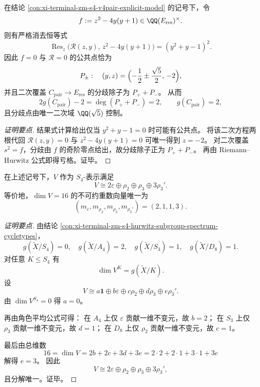 \begin{conclusion}\label{con:xi-terminal-zm-s4-v4pair-golden-ratio-branch-divisor}
在结论 \ref{con:xi-terminal-zm-s4-v4pair-explicit-model} 的记号下，令
\[
f:=z^2-4y(y+1)\in \QQ(E_{\mathrm{res}})^\times.
\]
则有严格消去恒等式
\[
\operatorname{Res}_z\!\bigl(\mathscr R(z,y),\,z^2-4y(y+1)\bigr)=(y^2+y-1)^2.
\]
因此 \(f=0\) 与 \(\mathscr R=0\) 的公共点恰为
\[
P_\pm:\quad
(y,z)=\Bigl(-\frac12\pm\frac{\sqrt5}{2},\,-2\Bigr),
\]
并且二次覆盖 \(C_{\mathrm{pair}}\to E_{\mathrm{res}}\) 的分歧除子为 \(P_++P_-\)。
从而
\[
2g(C_{\mathrm{pair}})-2=\deg(P_++P_-)=2,\qquad g(C_{\mathrm{pair}})=2,
\]
且分歧点由唯一二次域 \(\QQ(\sqrt5)\) 控制。
\end{conclusion}
\begin{proof}[证明要点]
结果式计算给出仅当 \(y^2+y-1=0\) 时可能有公共点。
将该二次方程两根代回 \(\mathscr R(z,y)=0\) 与 \(z^2-4y(y+1)=0\) 可唯一得到 \(z=-2\)。
对二次覆盖 \(s^2=f\)，分歧由 \(f\) 的奇阶零点给出，故分歧除子正为 \(P_++P_-\)。
再由 Riemann--Hurwitz 公式即得亏格。证毕。
\end{proof}

\begin{conclusion}\label{con:xi-terminal-zm-s4-chevalley-weil-explicit-decomposition}
在上述记号下，\(V\) 作为 \(S_4\)-表示满足
\[
V\cong 2\varepsilon\oplus \rho_2\oplus \rho_3\oplus 3\rho_3'.
\]
等价地，\(\dim V=16\) 的不可约重数向量唯一为
\[
(m_{\varepsilon},m_{\rho_2},m_{\rho_3},m_{\rho_3'})=(2,1,1,3).
\]
\end{conclusion}
\begin{proof}[证明要点]
由结论 \ref{con:xi-terminal-zm-s4-hurwitz-subgroup-spectrum-cycletypes}，
\[
g(\widetilde{X}/S_4)=0,\quad
g(\widetilde{X}/A_4)=2,\quad
g(\widetilde{X}/S_3)=1,\quad
g(\widetilde{X}/D_8)=1.
\]
对任意 \(K\le S_4\) 有
\[
\dim V^K=g(\widetilde{X}/K).
\]
设
\[
V\cong a\mathbf 1\oplus b\varepsilon\oplus c\rho_2\oplus d\rho_3\oplus e\rho_3'.
\]
由 \(\dim V^{S_4}=0\) 得 \(a=0\)。

再由角色平均公式可得：
在 \(A_4\) 上仅 \(\varepsilon\) 贡献一维不变元，故 \(b=2\)；
在 \(S_3\) 上仅 \(\rho_3\) 贡献一维不变元，故 \(d=1\)；
在 \(D_8\) 上仅 \(\rho_2\) 贡献一维不变元，故 \(c=1\)。

最后由总维数
\[
16=\dim V=2b+2c+3d+3e
=2\cdot2+2\cdot1+3\cdot1+3e
\]
解得 \(e=3\)。
因此
\[
V\cong 2\varepsilon\oplus \rho_2\oplus \rho_3\oplus 3\rho_3',
\]
且分解唯一。证毕。
\end{proof}

